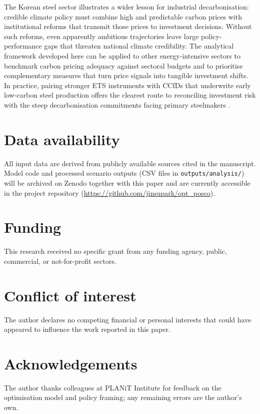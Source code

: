 \documentclass[preprint,1p,authoryear]{elsarticle}
\begin{document}
The Korean steel sector illustrates a wider lesson for industrial decarbonisation: credible climate policy must combine high and predictable carbon prices with institutional reforms that transmit those prices to investment decisions. Without such reforms, even apparently ambitious trajectories leave large policy-performance gaps that threaten national climate credibility. The analytical framework developed here can be applied to other energy-intensive sectors to benchmark carbon pricing adequacy against sectoral budgets and to prioritise complementary measures that turn price signals into tangible investment shifts. In practice, pairing stronger ETS instruments with CCfDs that underwrite early low-carbon steel production offers the clearest route to reconciling investment risk with the steep decarbonisation commitments facing primary steelmakers \citep{Neuhoff2019CCfD}.







\section*{Data availability}
All input data are derived from publicly available sources cited in the manuscript. Model code and processed scenario outputs (CSV files in \texttt{outputs/analysis/}) will be archived on Zenodo together with this paper and are currently accessible in the project repository (\url{https://github.com/jinsupark/opt\_posco}).

\section*{Funding}
This research received no specific grant from any funding agency, public, commercial, or not-for-profit sectors.

\section*{Conflict of interest}
The author declares no competing financial or personal interests that could have appeared to influence the work reported in this paper.

\section*{Acknowledgements}
The author thanks colleagues at PLANiT Institute for feedback on the optimisation model and policy framing; any remaining errors are the author’s own.
\end{document}
